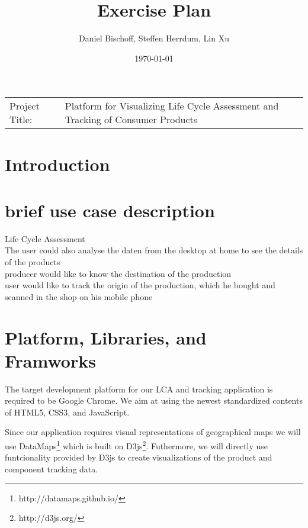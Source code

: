 \documentclass[a4page]{article}
\author{Daniel Bischoff, Steffen Herrdum, Lin Xu}
\title{Exercise Plan}
\date{\today}
\begin{document}
\maketitle

\begin{table}[!th]
\begin{tabular}{l p{}}

Project Title: & Platform for Visualizing Life Cycle Assessment and Tracking of Consumer Products \\

\end{tabular}
\end{table}

\section{Introduction}

\section{brief use case description}
Life Cycle Assessment\\
The user could also analyse the daten from the desktop at home to see the details of the products\\
producer would like to know the destination of the production\\
user would like to track the origin of the production, which he bought and scanned in the shop on his mobile phone\\

\section{Platform, Libraries, and Framworks}
The target development platform for our \ac{LCA} and tracking application is required to be Google Chrome. 
We aim at using the newest standardized contents of HTML5, CSS3, and JavaScript.

Since our application requires visual representations of geographical maps we will use DataMaps\footnote{http://datamaps.github.io/} which is built on D3js\footnote{http://d3js.org/}.
Futhermore, we will directly use funtcionality provided by D3js to create visualizations of the product and component tracking data.
\end{document}

